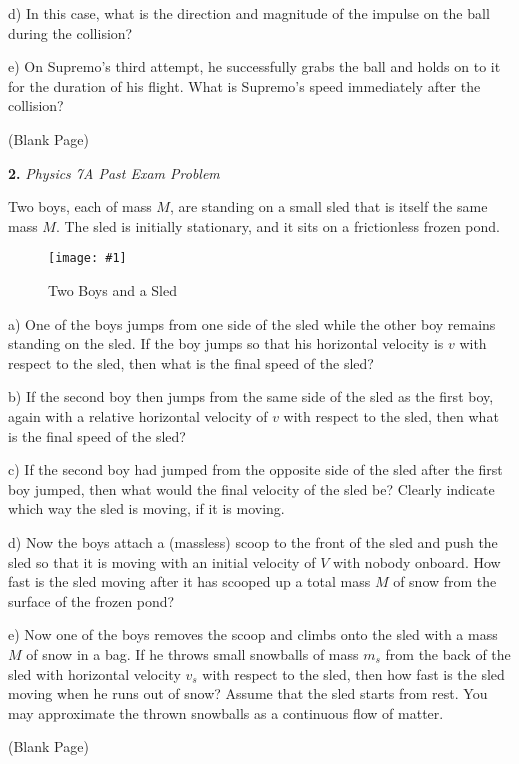 \documentclass[11pt]{article}
\newcommand{\fig}[4]{
    \begin{figure}[H]
        \centering
        \texttt{[image: \#1]}
        \caption{#2}
        \label{exp4fit}
    \end{figure}
}
\theoremstyle{gangnamstyle}{\newtheorem{definition}{Definition}[]}
\theoremstyle{gangnamstyle}{\newtheorem{example}{Example}[]}
\theoremstyle{gangnamstyle}{\newtheorem{problem}{Problem}[]}
\begin{document}
d) In this case, what is the direction and magnitude of the impulse on the ball during the collision?

e) On Supremo’s third attempt, he successfully grabs the ball and holds on to it for the duration of his flight. What is Supremo’s speed immediately after the collision? 

\pagebreak

\begin{center}
(Blank Page)
\end{center}

\pagebreak

\textbf{2.} \textit{Physics 7A Past Exam Problem}

Two boys, each of mass $M$, are standing on a small sled that is itself the same mass $M$. The sled is initially stationary, and it sits on a frictionless frozen pond.

\fig{figs/mt2/deweese5.png}{Two Boys and a Sled}{0.65}{0}

a) One of the boys jumps from one side of the sled while the other boy remains standing on the sled. If the boy jumps so that his horizontal velocity is $v$ with respect to the sled, then what is the final speed of the sled?

b) If the second boy then jumps from the same side of the sled as the first boy, again with a relative horizontal velocity of $v$ with respect to the sled, then what is the final speed of the sled?

c) If the second boy had jumped from the opposite side of the sled after the first boy jumped, then what would the final velocity of the sled be? Clearly indicate which way the sled is moving, if it is moving.

d) Now the boys attach a (massless) scoop to the front of the sled and push the sled so that it is moving with an initial velocity of $V$ with nobody onboard. How fast is the sled moving after it has scooped up a total mass $M$ of snow from the surface of the frozen pond?

e) Now one of the boys removes the scoop and climbs onto the sled with a mass $M$ of snow in a bag. If he throws small snowballs of mass $m_s$ from the back of the sled with horizontal velocity $v_s$ with respect to the sled, then how fast is the sled moving when he runs out of snow? Assume that the sled starts from rest. You may approximate the thrown snowballs as a continuous flow of matter.

\pagebreak

\begin{center}
(Blank Page)
\end{center}
\end{document}

